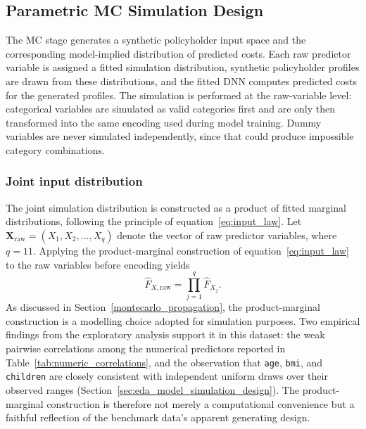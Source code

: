 \subsection{Parametric MC Simulation Design}
\label{sec:mc_simulation_design}

The MC stage generates a synthetic policyholder input space and
the corresponding model-implied distribution of predicted costs.  Each raw
predictor variable is assigned a fitted simulation distribution, synthetic
policyholder profiles are drawn from these distributions, and the fitted
DNN computes predicted costs for the generated profiles.  The
simulation is performed at the raw-variable level: categorical variables
are simulated as valid categories first and are only then transformed into
the same encoding used during model training.  Dummy variables are never
simulated independently, since that could produce impossible category
combinations.

\subsubsection{Joint input distribution}

The joint simulation distribution is constructed as a product of fitted
marginal distributions, following the principle of
equation~\eqref{eq:input_law}.  Let
$\mathbf{X}_{\mathrm{raw}} = (X_1, X_2, \ldots, X_q)$ denote the vector of
raw predictor variables, where $q = 11$.  Applying the product-marginal
construction of equation~\eqref{eq:input_law} to the raw variables before
encoding yields
\begin{equation}
    \widehat{F}_{X,\mathrm{raw}}
    =
    \prod_{j=1}^{q}
    \widehat{F}_{X_j}.
    \label{eq:raw_product_mc_distribution_ch3}
\end{equation}
As discussed in Section~\ref{montecarlo_propagation}, the product-marginal
construction is a modelling choice adopted for simulation purposes.  Two
empirical findings from the exploratory analysis support it in this dataset: the weak pairwise
correlations among the numerical predictors reported in
Table~\ref{tab:numeric_correlations}, and the observation that
\texttt{age}, \texttt{bmi}, and \texttt{children} are closely consistent
with independent uniform draws over their observed ranges
(Section~\ref{sec:eda_model_simulation_design}).  The product-marginal
construction is therefore not merely a computational convenience but a
faithful reflection of the benchmark data's apparent generating design.

